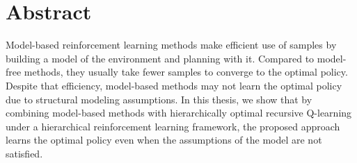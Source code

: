 






\chapter{Abstract}

Model-based reinforcement learning methods make efficient use of samples by 
building a model of the environment and planning with it.
Compared to model-free methods, they usually take fewer samples to converge to the optimal policy.
Despite that efficiency, model-based methods may not learn the optimal policy due to 
structural modeling assumptions.
In this thesis, we show that by combining model-based methods with 
hierarchically optimal recursive Q-learning under 
a hierarchical reinforcement learning framework, 
the proposed approach learns the optimal policy even when
the assumptions of the model are not satisfied.

\vfill
\begin{center}
\begin{sf}
\end{sf}
\end{center}
